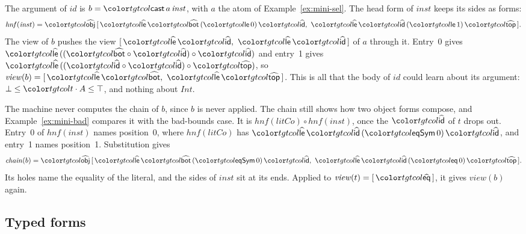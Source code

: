 \begin{example}\label{ex:mini-view}
The argument of $\mathit{id}$ is $b = \ev{cast}\,a\,\mathit{inst}$, with $a$ the atom of Example~\ref{ex:mini-sel}. The head form of $\mathit{inst}$ keeps its sides as forms:
\[
\mathit{hnf}(\mathit{inst}) = \form{obj}\,[\,\form{le}\,\form{bot}\,(\ev{le}\,0)\,\form{id},\ \form{le}\,\form{id}\,(\ev{le}\,1)\,\form{top}\,] .
\]
The view of $b$ pushes the view $[\,\form{le}\,\form{id},\ \form{le}\,\form{id}\,]$ of $a$ through it. Entry~0 gives $\form{le}\,((\form{bot} \circ \form{id}) \circ \form{id})$ and entry~1 gives $\form{le}\,((\form{id} \circ \form{id}) \circ \form{top})$, so $\mathit{view}(b) = [\,\form{le}\,\form{bot},\ \form{le}\,\form{top}\,]$. This is all that the body of $\mathit{id}$ could learn about its argument: $\bot \le \sel{t}{A} \le \top$, and nothing about $\mathit{Int}$.

The machine never computes the chain of $b$, since $b$ is never applied. The chain still shows how two object forms compose, and Example~\ref{ex:mini-bad} compares it with the bad-bounds case. It is $\mathit{hnf}(\mathit{litCo}) \circ \mathit{hnf}(\mathit{inst})$, once the $\form{id}$ of $t$ drops out. Entry~0 of $\mathit{hnf}(\mathit{inst})$ names position~0, where $\mathit{hnf}(\mathit{litCo})$ has $\form{le}\,\form{id}\,(\ev{eqSym}\,0)\,\form{id}$, and entry~1 names position~1. Substitution gives
\[
\mathit{chain}(b) = \form{obj}\,[\,\form{le}\,\form{bot}\,(\ev{eqSym}\,0)\,\form{id},\ \form{le}\,\form{id}\,(\ev{eq}\,0)\,\form{top}\,] .
\]
Its holes name the equality of the literal, and the sides of $\mathit{inst}$ sit at its ends. Applied to $\mathit{view}(t) = [\,\form{eq}\,]$, it gives $\mathit{view}(b)$ again.
\end{example}

\FloatBarrier
\subsection{Typed forms}\label{sec:mini-typed}

